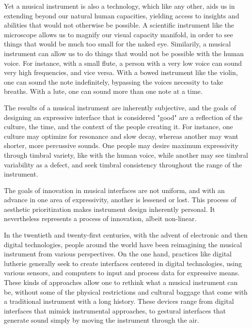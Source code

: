 \documentclass[12pt,twoside,maitrise]{dms_ks}
\theoremstyle{definition}
\begin{document}
Yet a musical instrument is also a technology, which like any other, aids us in extending beyond our natural human capacities, yielding access to insights and abilities that would not otherwise be possible. 
A scientific instrument like the microscope allows us to magnify our visual capacity manifold, in order to see things that would be much too small for the naked eye. 
Similarily, a musical instrument can allow us to do things that would not be possible with the human voice. 
For instance, with a small flute, a person with a very low voice can sound very high frequencies, and vice versa. 
With a bowed instrument like the violin, one can sound the note indefinitely, bypassing the voices necessity to take breaths. 
With a lute, one can sound more than one note at a time. 

The results of a musical instrument are inherently subjective, and the goals of designing an expressive interface that is considered "good" are a reflection of the culture, the time, and the context of the people creating it. 
For instance, one culture may optimize for resonance and slow decay, whereas another may want shorter, more percussive sounds. 
One people may desire maximum expressivity through timbral variety, like with the human voice, while another may see timbral variability as a defect, and seek timbral consistency throughout the range of the instrument. 

The goals of innovation in musical interfaces are not uniform, and with an advance in one area of expressivity, another is lessened or lost. 
This process of aesthetic prioritization makes instrument design inherently personal. It nevertheless represents a process of innovation, albeit non-linear. 

In the twentieth and twenty-first centuries, with the advent of electronic and then digital technologies, people around the world have been reimagining the musical instrument from various perspectives. 
On the one hand, practices like digital lutherie generally seek to create interfaces centered in digital technologies, using various sensors, and computers to input and process data for expressive means. 
These kinds of approaches allow one to rethink what a musical instrument can be, without some of the physical restrictions and cultural baggage that come with a traditional instrument with a long history. 
These devices range from digital interfaces that mimick instrumental approaches, to gestural interfaces that generate sound simply by moving the instrument through the air.
\end{document}

